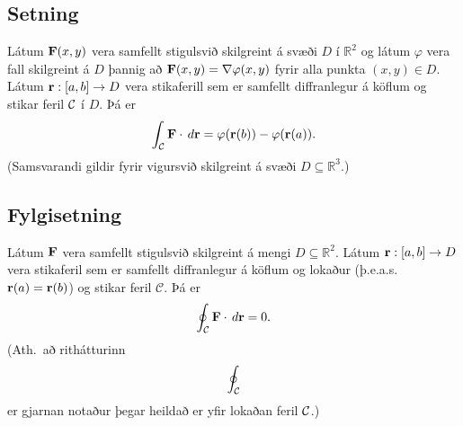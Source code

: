 \documentclass[a4paper,10pt,icelandic]{sphinxmanual}
\begin{document}
\subsection{Setning}
\label{Kafli5:id10}
Látum \(\mbox{${\bf F}$}(x,y)\) vera samfellt stigulsvið skilgreint
á svæði \(D\) í \({\mathbb  R}^2\) og látum \(\varphi\) vera
fall skilgreint á \(D\) þannig að
\(\mbox{${\bf F}$}(x,y)=\nabla \varphi(x,y)\) fyrir alla punkta
\((x,y)\in D\). Látum \(\mbox{${\bf r}$}:[a,b]\rightarrow D\)
vera stikaferill sem er samfellt diffranlegur á köflum og stikar feril
\(\cal C\) í \(D\). Þá er
\begin{gather}
\begin{split}\displaystyle \int_{\cal C} \mbox{${\bf F}$}\cdot \,d\mbox{${\bf r}$}=\varphi(\mbox{${\bf r}$}(b))-\varphi(\mbox{${\bf r}$}(a)).\end{split}\notag
\end{gather}
(Samsvarandi gildir fyrir vigursvið skilgreint á svæði
\(D\subseteq {\mathbb  R}^3\).)


\subsection{Fylgisetning}
\label{Kafli5:fylgisetning}
Látum \(\mbox{${\bf F}$}\) vera samfellt stigulsvið skilgreint á
mengi \(D\subseteq {\mathbb  R}^2\). Látum
\(\mbox{${\bf r}$}:[a,b]\rightarrow D\) vera stikaferil sem er
samfellt diffranlegur á köflum og lokaður (þ.e.a.s.
\(\mbox{${\bf r}$}(a)=\mbox{${\bf r}$}(b)\)) og stikar feril
\(\mathcal{C}\). Þá er
\begin{gather}
\begin{split}\displaystyle \oint_{\cal C}  \mbox{${\bf F}$}\cdot \,d\mbox{${\bf r}$}=0.\end{split}\notag
\end{gather}
(Ath. að rithátturinn
\begin{gather}
\begin{split}\displaystyle \oint_{\cal C}\end{split}\notag
\end{gather}
er gjarnan notaður þegar heildað er yfir lokaðan feril \(\cal C\).)
\end{document}
